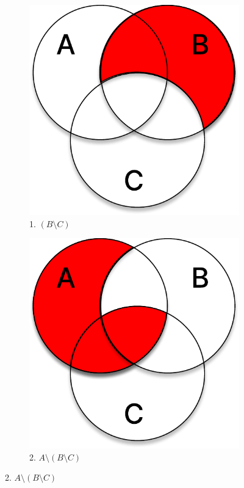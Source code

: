 \documentclass[11pt]{article}
\begin{document}
\begin{figure}[h]
	\captionsetup[subfigure]{labelformat=empty}
	\centering
	\begin{subfigure}{.32\textwidth}
		\centering
		\includegraphics[width=1\linewidth]{t3_2_1.pdf}
		\caption{1. $(B \setminus C)$}
	\end{subfigure}
	\begin{subfigure}{.32\textwidth}
		\centering
		\includegraphics[width=1\linewidth]{t3_2_2.pdf}
		\caption{2. $A \setminus (B \setminus C)$}
	\end{subfigure}
\end{figure}
\end{document}
